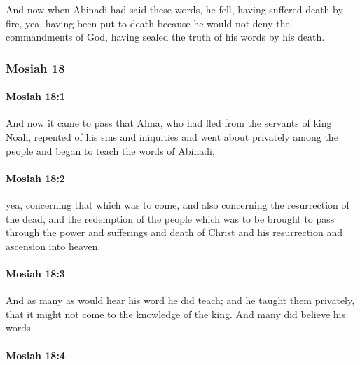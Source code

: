 			And now when Abinadi had said these words,
			he fell, having suffered death by fire,
			yea, having been put to death
			because he would not deny the commandments of God,
			having sealed the truth of his words by his death.
			
	\subsubsection{Mosiah 18} %
		\label{MOSIAH-18}
		
		\paragraph{Mosiah 18:1} %
			\label{MOSIAH-18-1}

			And now it came to pass that
			Alma, who had fled from the servants of king Noah,
			repented of his sins and iniquities
			and went about privately among the people
			and began to teach the words of Abinadi,

		\paragraph{Mosiah 18:2} %
			\label{MOSIAH-18-2}

			yea, concerning that which was to come,
			and also concerning the resurrection of the dead,
			and the redemption of the people which was to be brought to pass
			through the power and sufferings and death of Christ
			and his resurrection and ascension into heaven.

		\paragraph{Mosiah 18:3} %
			\label{MOSIAH-18-3}

			And as many as would hear his word he did teach;
			and he taught them privately,
			that it might not come to the knowledge of the king.
			And many did believe his words.

		\paragraph{Mosiah 18:4} %
			\label{MOSIAH-18-4}

